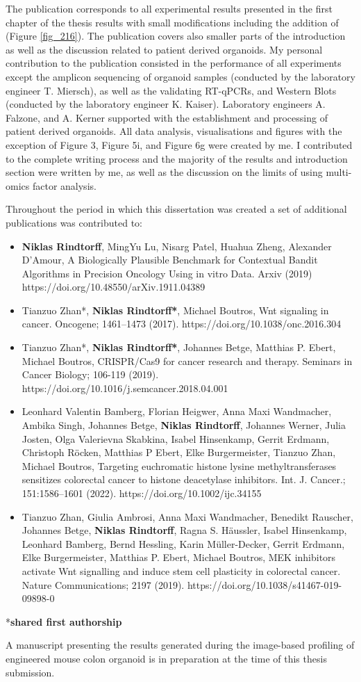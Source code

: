 \begin{flushleft}
\bigbreak
The publication corresponds to all experimental results presented in the first chapter of the thesis results with small modifications including the addition of (Figure \ref{fig_216}). The publication covers also smaller parts of the introduction as well as the discussion related to patient derived organoids. My personal contribution to the publication consisted in the performance of all experiments except the amplicon sequencing of organoid samples (conducted by the laboratory engineer T. Miersch), as well as the validating RT-qPCRs, and Western Blots (conducted by the laboratory engineer K. Kaiser). Laboratory engineers A. Falzone, and A. Kerner supported with the establishment and processing of patient derived organoids. All data analysis, visualisations and figures with the exception of Figure 3, Figure 5i, and Figure 6g were created by me. I contributed to the complete writing process and the majority of the results and introduction section were written by me, as well as the discussion on the limits of using multi-omics factor analysis.


\newpage

Throughout the period in which this dissertation was created a set of additional publications was contributed to: 
\begin{itemize} 
    \item \textbf{Niklas Rindtorff}, MingYu Lu, Nisarg Patel, Huahua Zheng, Alexander D'Amour, A Biologically Plausible Benchmark for Contextual Bandit Algorithms in Precision Oncology Using in vitro Data. Arxiv (2019) https://doi.org/10.48550/arXiv.1911.04389
    \item Tianzuo Zhan*, \textbf{Niklas Rindtorff*}, Michael Boutros, Wnt signaling in cancer. Oncogene; 1461–1473 (2017). https://doi.org/10.1038/onc.2016.304
    \item Tianzuo Zhan*, \textbf{Niklas Rindtorff*}, Johannes Betge, Matthias P. Ebert, Michael Boutros, CRISPR/Cas9 for cancer research and therapy. Seminars in Cancer Biology; 106-119 (2019). https://doi.org/10.1016/j.semcancer.2018.04.001
    \item Leonhard Valentin Bamberg, Florian Heigwer, Anna Maxi Wandmacher, Ambika Singh, Johannes Betge, \textbf{Niklas Rindtorff}, Johannes Werner, Julia Josten, Olga Valerievna Skabkina, Isabel Hinsenkamp, Gerrit Erdmann, Christoph Röcken, Matthias P Ebert, Elke Burgermeister, Tianzuo Zhan, Michael Boutros, Targeting euchromatic histone lysine methyltransferases
sensitizes colorectal cancer to histone deacetylase inhibitors. Int. J. Cancer.; 151:1586–1601 (2022). https://doi.org/10.1002/ijc.34155
    \item Tianzuo Zhan, Giulia Ambrosi, Anna Maxi Wandmacher, Benedikt Rauscher, Johannes Betge, \textbf{Niklas Rindtorff}, Ragna S. Häussler, Isabel Hinsenkamp, Leonhard Bamberg, Bernd Hessling, Karin Müller-Decker, Gerrit Erdmann, Elke Burgermeister, Matthias P. Ebert, Michael Boutros, MEK inhibitors activate Wnt signalling and induce stem cell plasticity in colorectal cancer. Nature Communications; 2197 (2019). https://doi.org/10.1038/s41467-019-09898-0
\end{itemize}
*\textbf{shared first authorship}
\bigbreak

A manuscript presenting the results generated during the image-based profiling of engineered mouse colon organoid is in preparation at the time of this thesis submission.
\end{flushleft}